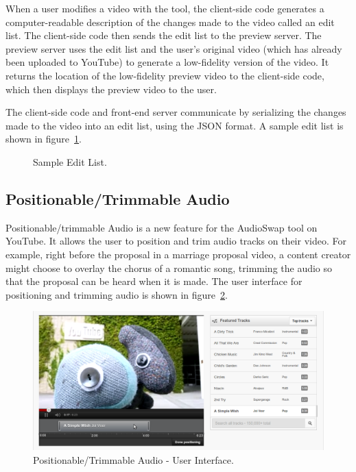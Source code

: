 \documentclass[se,resubmit]{uw-wkrpt}
\begin{document}
When a user modifies a video with the tool, the client-side code generates
a computer-readable description of the changes made to the video called an
edit list. The client-side code then sends the edit list to the preview
server. The preview server uses the edit list and the user's original
video (which has already been uploaded to YouTube) to generate a
low-fidelity version of the video. It returns the location of the
low-fidelity preview video to the client-side code, which then displays
the preview video to the user.

The client-side code and front-end server communicate by serializing the
changes made to the video into an edit list, using the JSON format. A
sample edit list is shown in figure~\ref{fig:editlist}.

\begin{figure}
  \centering
  
  \caption{Sample Edit List.}
  \label{fig:editlist}
\end{figure}

\subsection{Positionable/Trimmable Audio}\label{sec:ptaudio}
Positionable/trimmable Audio is a new feature for the AudioSwap tool on
YouTube. It allows the user to position and trim audio tracks on their
video. For example, right before the proposal in a marriage proposal video,
a content creator might choose to overlay the chorus of a romantic song,
trimming the audio so that the proposal can be heard when it is made. The
user interface for positioning and trimming audio is shown in
figure~\ref{fig:overview}.

\begin{figure}
  \centering
  \includegraphics[width=5.515in]{overview}
  \caption{Positionable/Trimmable Audio - User Interface.}
  \label{fig:overview}
\end{figure}
\end{document}
